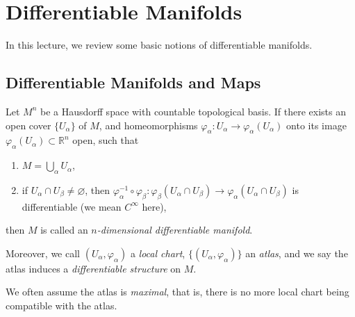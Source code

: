 \chapter{Differentiable Manifolds}
In this lecture, we review some basic notions of differentiable manifolds.

\section{Differentiable Manifolds and Maps}

\begin{defn}
    Let $M^n$ be a Hausdorff space with countable topological basis.
    If there exists an open cover $\{U_\alpha\}$ of $M$, and homeomorphisms $\varphi_\alpha:U_\alpha\to\varphi_\alpha(U_\alpha)$ onto its image $\varphi_\alpha(U_\alpha)\subset\mathbb{R}^n$ open, such that
    \begin{enumerate}[(1)]
        \item $M=\bigcup_\alpha U_\alpha$,
        \item if $U_\alpha\cap U_\beta\neq\varnothing$, then $\varphi_\alpha^{-1}\circ\varphi_\beta:\varphi_\beta(U_\alpha\cap U_\beta)\to\varphi_\alpha(U_\alpha\cap U_\beta)$ is differentiable (we mean $C^\infty$ here),
    \end{enumerate}
    then $M$ is called an \emph{$n$-dimensional differentiable manifold}.

    Moreover, we call $(U_\alpha,\varphi_\alpha)$ a \emph{local chart}, $\{(U_\alpha,\varphi_\alpha)\}$ an \emph{atlas}, and we say the atlas induces a \emph{differentiable structure} on $M$.
\end{defn}

\begin{rem}
    We often assume the atlas is \emph{maximal}, that is, there is no more local chart being compatible with the atlas.
\end{rem}


